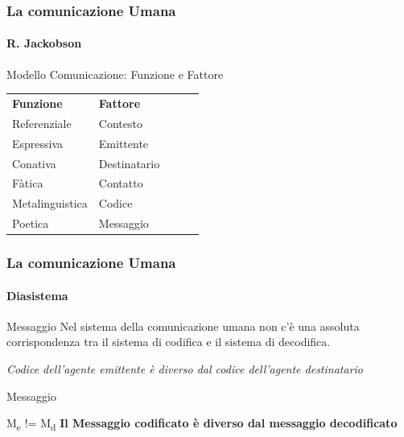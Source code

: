 \begin{frame}
	\frametitle{La comunicazione Umana}
	\framesubtitle{R. Jackobson}
	\addtocounter{nframe}{1}

	\begin{block}{Modello Comunicazione: Funzione e Fattore}

		\begin{table}[]
			\begin{tabular}{lllll}
			\textbf{Funzione} & \textbf{Fattore} &  &  &  \\
			Referenziale      & Contesto         &  &  &  \\
			Espressiva        & Emittente        &  &  &  \\
			Conativa          & Destinatario     &  &  &  \\
			Fàtica            & Contatto 		 &  &  &  \\
			Metalinguistica   & Codice			 &  &  &  \\
			Poetica 		  & Messaggio        &  &  &  \\
			\end{tabular}
			\end{table}
	\end{block}

\end{frame}

\begin{frame}
	\frametitle{La comunicazione Umana}
	\framesubtitle{Diasistema}
	\addtocounter{nframe}{1}

	\begin{block}{Messaggio}
		Nel sistema della comunicazione umana non c'è una assoluta corrispondenza tra il sistema di codifica e il sistema di decodifica.
		\begin{center}
			\textit{Codice dell'agente emittente è diverso dal codice dell'agente destinatario}
		\end{center}
	\end{block}

	\begin{block}{Messaggio}
		\begin{center}
			M\textsubscript{e} != M\textsubscript{d}
			\textbf{Il Messaggio codificato è diverso dal messaggio decodificato}
		\end{center}
	\end{block}

\end{frame}

